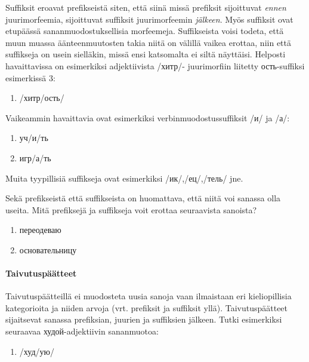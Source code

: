 \documentclass[]{scrartcl}
\begin{document}
Suffiksit eroavat prefikseistä siten, että siinä missä prefiksit
sijoittuvat \emph{ennen} juurimorfeemia, sijoittuvat suffiksit
juurimorfeemin \emph{jälkeen}. Myös suffiksit ovat etupäässä
sananmuodostuksellisia morfeemeja. Suffikseista voisi todeta, että muun
muassa äänteenmuutosten takia niitä on välillä vaikea erottaa, niin että
suffikseja on usein sielläkin, missä ensi katsomalta ei siltä näyttäisi.
Helposti havaittavissa on esimerkiksi adjektiivista /хитр/- juurimorfiin
liitetty ость-suffiksi esimerkissä 3:

\begin{enumerate}
\def\labelenumi{(\arabic{enumi})}
\setcounter{enumi}{2}
\itemsep1pt\parskip0pt
\item
  /хитр/ость/
\end{enumerate}

Vaikeammin havaittavia ovat esimerkiksi verbinmuodostussuffiksit /и/ ja
/а/:

\begin{enumerate}
\def\labelenumi{(\arabic{enumi})}
\setcounter{enumi}{3}
\itemsep1pt\parskip0pt
\item
  уч/и/ть
\item
  игр/а/ть
\end{enumerate}

Muita tyypillisiä suffikseja ovat esimerkiksi /ик/,/ец/,/тель/ jne.

Sekä prefikseistä että suffikseista on huomattava, että niitä voi
sanassa olla useita. Mitä prefiksejä ja suffikseja voit erottaa
seuraavista sanoista?

\begin{enumerate}
\def\labelenumi{(\arabic{enumi})}
\setcounter{enumi}{5}
\itemsep1pt\parskip0pt
\item
  переодеваю
\item
  основательницу
\end{enumerate}

\paragraph{Taivutuspäätteet}\label{taivutuspuxe4uxe4tteet}

Taivutuspäätteillä ei muodosteta uusia sanoja vaan ilmaistaan eri
kieliopillisia kategorioita ja niiden arvoja (vrt. prefiksit ja
suffiksit yllä). Taivutuspäätteet sijaitsevat sanassa prefiksian,
juurien ja suffiksien jälkeen. Tutki esimerkiksi seuraavaa
худой-adjektiivin sananmuotoa:

\begin{enumerate}
\def\labelenumi{(\arabic{enumi})}
\setcounter{enumi}{7}
\itemsep1pt\parskip0pt
\item
  /худ/ую/
\end{enumerate}
\end{document}
